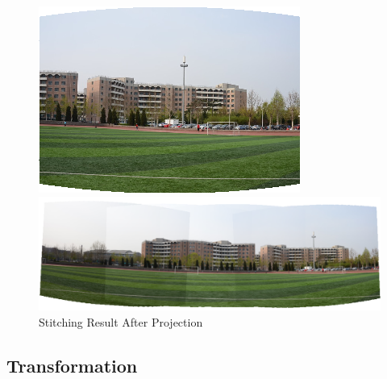 \begin{enumerate}
\begin{figure}[H]
\begin{minipage}[b]{0.24\linewidth}
  \end{minipage}
  \begin{minipage}[b]{0.24\linewidth}
    \includegraphics[scale=0.3]{res/4.png}
  \end{minipage}

    \includegraphics[width=1.0\textwidth]{res/warped_stitch.png}
  \caption{Stitching Result After Projection\label{fig:cyl}}
\end{figure}

\end{enumerate}

\subsection{Transformation}

